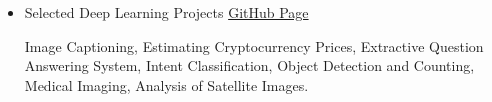 \documentclass[11pt,a4paper,sans]{moderncv} %
\begin{document}
\begin{itemize}
			
			
  	\vspace{1em}
		\item \href{https://github.com/MJAHMADEE/DeepLearning2022}{} Selected Deep Learning Projects \hfill \href{https://github.com/MJAHMADEE/DeepLearning2022}{GitHub Page}
        
        Image Captioning, Estimating Cryptocurrency Prices, Extractive Question Answering System, Intent Classification, Object Detection and Counting, Medical Imaging,  Analysis of Satellite Images.
        


  
  


\end{itemize}
\end{document}
